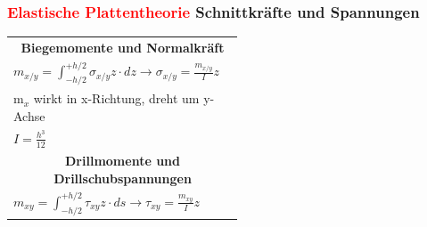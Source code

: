 	\begin{minipage}{0.65\linewidth}
		
		\subsubsection{\textcolor{red}{Elastische Plattentheorie} Schnittkräfte und Spannungen}
		
			\begin{tabular}{|lp{0.3\linewidth}|}
					
					\multicolumn{2}{c}{\textbf{Biegemomente und Normalkräft}} \\
					
					$ m_{x/y} = \int_{-h/2}^{+h/2} \sigma_{x/y} z \cdot dz \rightarrow \sigma_{x/y} = \frac{m_{x/y}}{I}z $	& \multirow{2}{*}{\includegraphics[width=\linewidth]{images/DW1Momente.PNG}}	\\
											 m$_x$ wirkt in x-Richtung, dreht um y-Achse  & \\
											 $ I = \frac{h^3}{12} $	 &  \\ \hline
					
					\multicolumn{2}{c}{\textbf{Drillmomente und Drillschubspannungen}} \\
					
					$ m_{xy} = \int_{-h/2}^{+h/2} \tau_{xy} z \cdot ds \rightarrow \tau_{xy} = \frac{m_{xy}}{I} z $		&	\multirow{2}{*}{\includegraphics[width=\linewidth]{images/DW2Drillmomente.PNG}} \\
					

\end{tabular}
\end{minipage}
